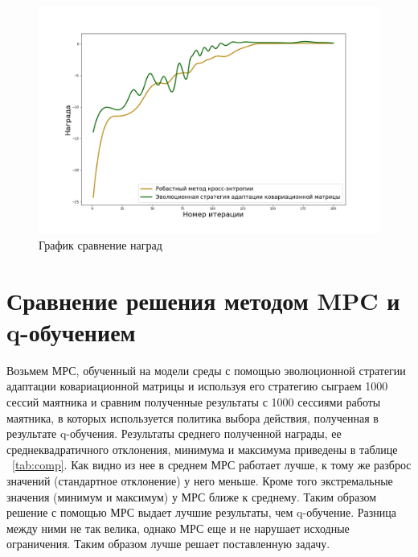 \begin{figure}[!h]
	\centering
	\includegraphics[scale=0.5]{mca_reward.png}
	\caption {График сравнение наград}
	\label{fig:mca-rew}
\end{figure}

 
 \section{Сравнение решения методом MPC  и q-обучением}\label{1sec:optimal-control}

Возьмем МРС, обученный на модели среды с помощью эволюционной стратегии адаптации ковариационной матрицы и используя его стратегию сыграем 1000 сессий маятника и сравним полученные результаты с 1000 сессиями работы маятника, в которых используется политика выбора действия, полученная в результате q-обучения. Результаты среднего полученной награды, ее среднеквадратичного отклонения, минимума и максимума приведены в таблице ~\ref{tab:comp}. Как видно из нее в среднем МРС работает лучше, к тому же разброс значений (стандартное отклонение) у него меньше. Кроме того экстремальные значения (минимум и максимум) у МРС ближе к среднему. Таким образом решение с помощью МРС выдает лучшие результаты, чем q-обучение. Разница между ними не так велика, однако МРС еще и не нарушает исходные ограничения. Таким образом лучше решает поставленную задачу.  
 


